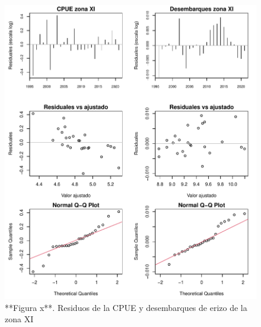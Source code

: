 \documentclass[
]{article}
\begin{document}
\begin{figure}

{\centering \includegraphics{Figuras/Fig_residualesIndicesXI-1} 

}

\caption{**Figura x**. Residuos de la CPUE y desembarques de erizo de la zona XI}\label{fig:Fig_residualesIndicesXI}
\end{figure}
\end{document}
